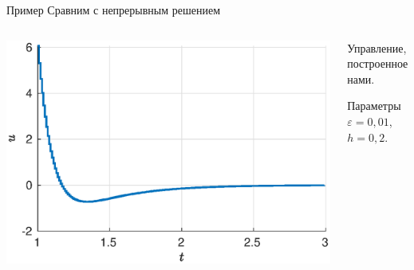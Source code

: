         \begin{frame}{Пример}
                Сравним с непрерывным решением
                \begin{columns}
                        \begin{column}{0.45\textwidth}
                                \includegraphics[width=1.15\textwidth]{content/example/small-control.eps}
                        \end{column}
                        \begin{column}{0.55\textwidth}
                                Управление, построенное нами.

                                \vspace{0.2cm}
                                
                                Параметры $\varepsilon = 0,\!01$, $h = 0,\!2$.


\end{column}
\end{columns}
\end{frame}
